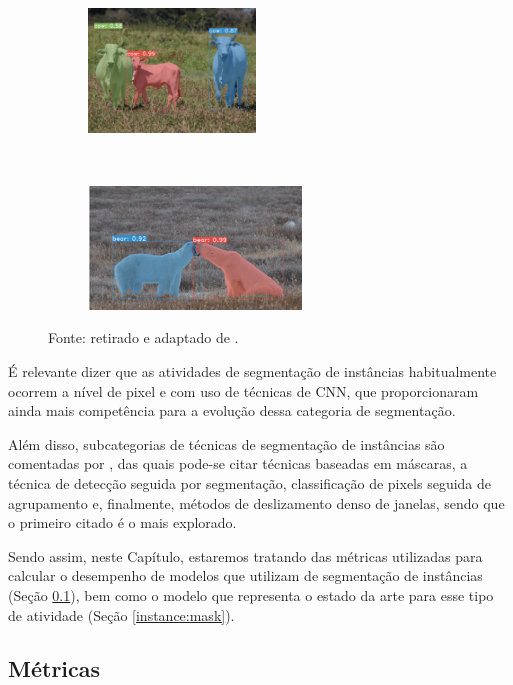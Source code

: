 \begin{figure}[H]
    \begin{subfigure}[t]{0.45\textwidth}
        \centering
        \includegraphics[height=1.3in]{recursos/imagens/instance/ins2.png}
        \label{instance:fig:4.3}
    \end{subfigure}
    ~
    \begin{subfigure}[t]{0.45\textwidth}
        \centering
        \includegraphics[height=1.3in]{recursos/imagens/instance/ins4.png}
        \label{instance:fig:4.4}
    \end{subfigure}

    \vspace*{1 cm}
    Fonte: retirado e adaptado de \cite{Bolya2019}.
\end{figure}

É relevante dizer que as atividades de segmentação de instâncias habitualmente ocorrem a nível de pixel e com uso de técnicas de CNN, que proporcionaram ainda mais competência para a evolução dessa categoria de segmentação.

Além disso, subcategorias de técnicas de segmentação de instâncias são comentadas por \cite{Hafiz2020}, das quais pode-se citar técnicas baseadas em máscaras, a técnica de detecção seguida por segmentação, classificação de pixels seguida de agrupamento e, finalmente, métodos de deslizamento denso de janelas, sendo que o primeiro citado é o mais explorado.

Sendo assim, neste Capítulo, estaremos tratando das métricas utilizadas para calcular o desempenho de modelos que utilizam de segmentação de instâncias (Seção \ref{instance:metrics}), bem como o modelo que representa o estado da arte para esse tipo de atividade (Seção \ref{instance:mask}).


\subsection{Métricas}
\label{instance:metrics}

